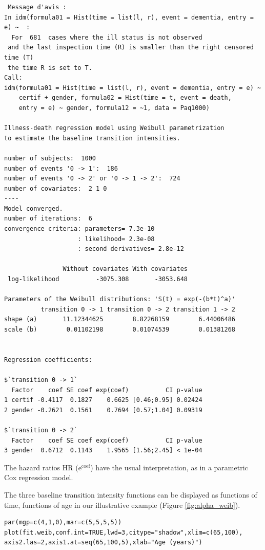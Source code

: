 \documentclass[article]{jss}
\begin{document}
\begin{verbatim}
 Message d'avis :
In idm(formula01 = Hist(time = list(l, r), event = dementia, entry = e) ~  :
  For  681  cases where the ill status is not observed
 and the last inspection time (R) is smaller than the right censored time (T)
 the time R is set to T.
Call:
idm(formula01 = Hist(time = list(l, r), event = dementia, entry = e) ~ 
    certif + gender, formula02 = Hist(time = t, event = death, 
    entry = e) ~ gender, formula12 = ~1, data = Paq1000)

Illness-death regression model using Weibull parametrization 
to estimate the baseline transition intensities.

number of subjects:  1000 
number of events '0 -> 1':  186 
number of events '0 -> 2' or '0 -> 1 -> 2':  724 
number of covariates:  2 1 0 
----
Model converged.
number of iterations:  6 
convergence criteria: parameters= 7.3e-10 
                    : likelihood= 2.3e-08 
                    : second derivatives= 2.8e-12 

                Without covariates With covariates
 log-likelihood          -3075.308       -3053.648

Parameters of the Weibull distributions: 'S(t) = exp(-(b*t)^a)'
          transition 0 -> 1 transition 0 -> 2 transition 1 -> 2
shape (a)       11.12344625        8.82268159        6.44006486
scale (b)        0.01102198        0.01074539        0.01381268


Regression coefficients:

$`transition 0 -> 1`
  Factor    coef SE coef exp(coef)          CI p-value
1 certif -0.4117  0.1827    0.6625 [0.46;0.95] 0.02424
2 gender -0.2621  0.1561    0.7694 [0.57;1.04] 0.09319

$`transition 0 -> 2`
  Factor    coef SE coef exp(coef)          CI p-value
3 gender  0.6712  0.1143    1.9565 [1.56;2.45] < 1e-04
\end{verbatim}


The hazard ratios HR (\(\mathrm{e}^{\text{coef}}\)) have the usual interpretation, 
as in a parametric Cox regression model.

The three baseline transition intensity functions can be displayed as
functions of time, functions of age in our illustrative example 
(Figure \ref{fig:alpha_weib}).
\lstset{language=R,label= ,caption= ,numbers=none}
\begin{lstlisting}
par(mgp=c(4,1,0),mar=c(5,5,5,5))
plot(fit.weib,conf.int=TRUE,lwd=3,citype="shadow",xlim=c(65,100), axis2.las=2,axis1.at=seq(65,100,5),xlab="Age (years)")
\end{lstlisting}
\end{document}
